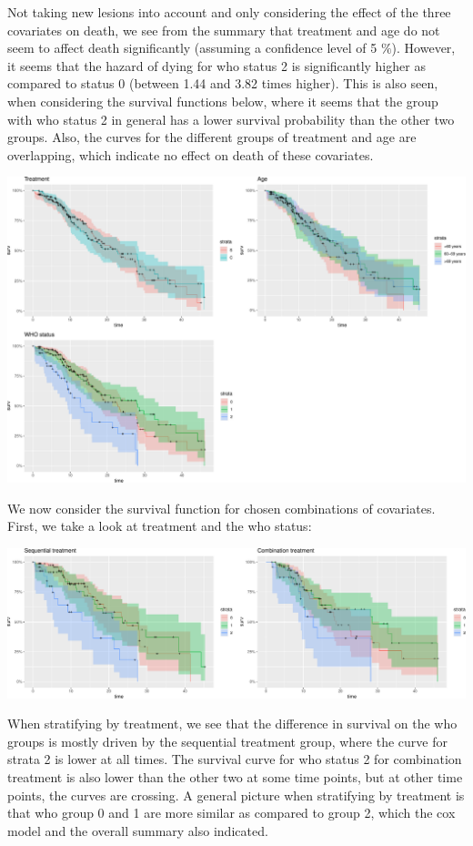 \documentclass[
  11pt,
]{article}
\begin{document}
Not taking new lesions into account and only considering the effect of
the three covariates on death, we see from the summary that treatment
and age do not seem to affect death significantly (assuming a confidence
level of 5 \(\%\)). However, it seems that the hazard of dying for who
status 2 is significantly higher as compared to status 0 (between 1.44
and 3.82 times higher). This is also seen, when considering the survival
functions below, where it seems that the group with who status 2 in
general has a lower survival probability than the other two groups.
Also, the curves for the different groups of treatment and age are
overlapping, which indicate no effect on death of these covariates.

\includegraphics{Exam2021_PracticalPart_files/figure-latex/unnamed-chunk-7-1.pdf}

We now consider the survival function for chosen combinations of
covariates. First, we take a look at treatment and the who status:

\includegraphics{Exam2021_PracticalPart_files/figure-latex/unnamed-chunk-8-1.pdf}

When stratifying by treatment, we see that the difference in survival on
the who groups is mostly driven by the sequential treatment group, where
the curve for strata 2 is lower at all times. The survival curve for who
status 2 for combination treatment is also lower than the other two at
some time points, but at other time points, the curves are crossing. A
general picture when stratifying by treatment is that who group 0 and 1
are more similar as compared to group 2, which the cox model and the
overall summary also indicated.
\end{document}
